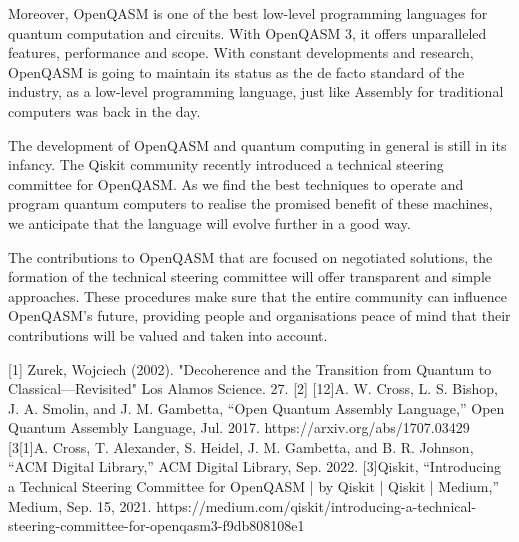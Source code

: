 \documentclass[conference]{IEEEtran}
\begin{document}
Moreover, OpenQASM is one of the best low-level programming languages for quantum computation and circuits. With OpenQASM 3, it offers unparalleled features, performance and scope. With constant developments and research, OpenQASM is going to maintain its status as the de facto standard of the industry, as a low-level programming language, just like Assembly for traditional computers was back in the day. 

The development of OpenQASM and quantum computing in general is still in its infancy. The Qiskit community recently introduced a technical steering committee for OpenQASM. As we find the best techniques to operate and program quantum computers to realise the promised benefit of these machines, we anticipate that the language will evolve further in a good way. \cite{b4}

The contributions to OpenQASM that are focused on negotiated solutions, the formation of the technical steering committee will offer transparent and simple approaches. These procedures make sure that the entire community can influence OpenQASM's future, providing people and organisations peace of mind that their contributions will be valued and taken into account. \cite{b4}

\begin{thebibliography}{00}
[1] Zurek, Wojciech (2002). "Decoherence and the Transition from Quantum to Classical—Revisited" Los Alamos Science. 27.
 [2] [12]A. W. Cross, L. S. Bishop, J.  A. Smolin, and J. M. Gambetta, “Open Quantum Assembly Language,” Open Quantum Assembly Language, Jul. 2017. https://arxiv.org/abs/1707.03429
 [3[1]A. Cross, T. Alexander, S. Heidel, J. M. Gambetta, and B. R. Johnson, “ACM Digital Library,” ACM Digital Library, Sep. 2022.
 [3]Qiskit, “Introducing a Technical Steering Committee for OpenQASM | by Qiskit | Qiskit | Medium,” Medium, Sep. 15, 2021. https://medium.com/qiskit/introducing-a-technical-steering-committee-for-openqasm3-f9db808108e1
\end{thebibliography}
\end{document}
